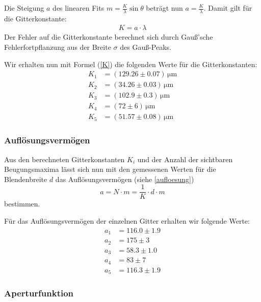 \documentclass[12pt]{article}
\begin{document}
Die Steigung $a$ des linearen Fits $m=\frac{K}{\lambda}\sin\theta$ beträgt nun $a=\frac{K}{\lambda}$. Damit gilt für die Gitterkonstante: 
\begin{align}
	K=a\cdot\lambda \label{K}
\end{align}
Der Fehler auf die Gitterkonstante berechnet sich durch Gauß'sche Fehlerfortpflanzung aus der Breite $\sigma$ des Gauß-Peaks.


Wir erhalten nun mit Formel (\ref{K}) die folgenden Werte für die Gitterkonstanten:
\begin{align}
	K_1&=(129.26\pm0.07)\,\mathrm{\mu m}  \label{K1}\\
	K_2&=(34.26\pm0.03)\,\mathrm{\mu m}\\
	K_3&=(102.9\pm0.3)\,\mathrm{\mu m}\\
	K_4&=(72\pm6)\,\mathrm{\mu m}\\
	K_5&=(51.57\pm0.08)\,\mathrm{\mu m}
\end{align}

\subsubsection{Auflösungsvermögen}

Aus den berechneten Gitterkonstanten $K_i$ und der Anzahl der sichtbaren Beugungsmaxima lässt sich nun mit den gemessenen Werten für die Blendenbreite $d$ das Auflösungsvermögen (siehe \ref{aufloesung}) $$a=N\cdot m=\frac1K\cdot d\cdot m$$ bestimmen.

Für das Auflösungsvermögen der einzelnen Gitter erhalten wir folgende Werte:
\begin{align}
	a_1&=116.0\pm1.9\\
	a_2&=175\pm3\\
	a_3&=58.3\pm1.0\\
	a_4&=83\pm7\\
	a_5&=116.3\pm1.9
\end{align}

\subsubsection{Aperturfunktion}
\end{document}

